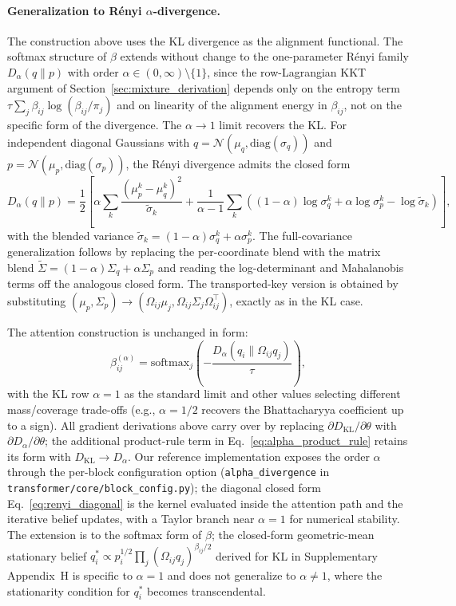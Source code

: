 \documentclass[twoside,11pt]{article}
\begin{document}
\paragraph{Generalization to R\'enyi $\alpha$-divergence.}

The construction above uses the KL divergence as the alignment functional. The softmax structure of $\beta$ extends without change to the one-parameter R\'enyi family $D_\alpha(q \| p)$ with order $\alpha \in (0, \infty) \setminus \{1\}$, since the row-Lagrangian KKT argument of Section~\ref{sec:mixture_derivation} depends only on the entropy term $\tau\sum_j\beta_{ij}\log(\beta_{ij}/\pi_j)$ and on linearity of the alignment energy in $\beta_{ij}$, not on the specific form of the divergence. The $\alpha \to 1$ limit recovers the KL. For independent diagonal Gaussians with $q = \mathcal{N}(\mu_q, \mathrm{diag}(\sigma_q))$ and $p = \mathcal{N}(\mu_p, \mathrm{diag}(\sigma_p))$, the R\'enyi divergence admits the closed form
\begin{equation}
D_\alpha(q \| p) = \frac{1}{2}\left[ \alpha \sum_k \frac{(\mu_p^k - \mu_q^k)^2}{\tilde\sigma_k} + \frac{1}{\alpha - 1} \sum_k \left((1-\alpha)\log \sigma_q^k + \alpha \log \sigma_p^k - \log \tilde\sigma_k\right) \right],
\label{eq:renyi_diagonal}
\end{equation}
with the blended variance $\tilde\sigma_k = (1-\alpha)\sigma_q^k + \alpha\sigma_p^k$. The full-covariance generalization follows by replacing the per-coordinate blend with the matrix blend $\tilde\Sigma = (1-\alpha)\Sigma_q + \alpha \Sigma_p$ and reading the log-determinant and Mahalanobis terms off the analogous closed form. The transported-key version is obtained by substituting $(\mu_p, \Sigma_p) \to (\Omega_{ij}\mu_j, \Omega_{ij}\Sigma_j\Omega_{ij}^\top)$, exactly as in the KL case.

The attention construction is unchanged in form:
\begin{equation}
\beta_{ij}^{(\alpha)} = \mathrm{softmax}_j\left(-\frac{D_\alpha(q_i \| \Omega_{ij} q_j)}{\tau}\right),
\label{eq:renyi_attention}
\end{equation}
with the KL row $\alpha = 1$ as the standard limit and other values selecting different mass/coverage trade-offs (e.g., $\alpha = 1/2$ recovers the Bhattacharyya coefficient up to a sign). All gradient derivations above carry over by replacing $\partial D_{\mathrm{KL}}/\partial \theta$ with $\partial D_\alpha/\partial \theta$; the additional product-rule term in Eq.~\eqref{eq:alpha_product_rule} retains its form with $D_{\mathrm{KL}} \to D_\alpha$. Our reference implementation exposes the order $\alpha$ through the per-block configuration option (\texttt{alpha\_divergence} in \texttt{transformer/core/block\_config.py}); the diagonal closed form Eq.~\eqref{eq:renyi_diagonal} is the kernel evaluated inside the attention path and the iterative belief updates, with a Taylor branch near $\alpha = 1$ for numerical stability. The extension is to the softmax form of $\beta$; the closed-form geometric-mean stationary belief $q_i^* \propto p_i^{1/2}\prod_j (\Omega_{ij}q_j)^{\beta_{ij}/2}$ derived for KL in Supplementary Appendix~H is specific to $\alpha = 1$ and does not generalize to $\alpha \neq 1$, where the stationarity condition for $q_i^*$ becomes transcendental.
\end{document}
